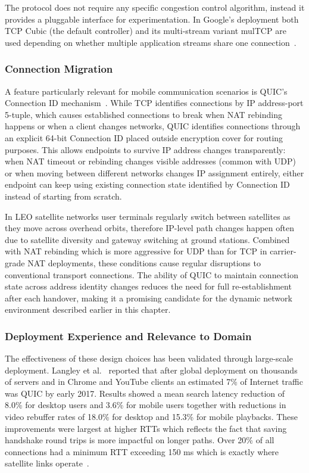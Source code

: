 The protocol does not require any specific congestion control algorithm, instead it provides a pluggable interface for experimentation. In Google's deployment both TCP Cubic (the default controller) and its multi-stream variant mulTCP are used depending on whether multiple application streams share one connection~\citep{LangleyAdam2017TQTP}.
\subsubsection{Connection Migration}

A feature particularly relevant for mobile communication scenarios is QUIC's Connection ID mechanism~\citep{LangleyAdam2017TQTP}. While TCP identifies connections by IP address-port 5-tuple, which causes established connections to break when NAT rebinding happens or when a client changes networks, QUIC identifies connections through an explicit 64-bit Connection ID placed outside encryption cover for routing purposes. This allows endpoints to survive IP address changes transparently: when NAT timeout or rebinding changes visible addresses (common with UDP) or when moving between different networks changes IP assignment entirely, either endpoint can keep using existing connection state identified by Connection ID instead of starting from scratch.

In LEO satellite networks user terminals regularly switch between satellites as they move across overhead orbits, therefore IP-level path changes happen often due to satellite diversity and gateway switching at ground stations. Combined with NAT rebinding which is more aggressive for UDP than for TCP in carrier-grade NAT deployments, these conditions cause regular disruptions to conventional transport connections. The ability of QUIC to maintain connection state across address identity changes reduces the need for full re-establishment after each handover, making it a promising candidate for the dynamic network environment described earlier in this chapter.
\subsubsection{Deployment Experience and Relevance to Domain}

The effectiveness of these design choices has been validated through large-scale deployment. Langley et al.~\citep{LangleyAdam2017TQTP} reported that after global deployment on thousands of servers and in Chrome and YouTube clients an estimated 7\% of Internet traffic was QUIC by early 2017. Results showed a mean search latency reduction of 8.0\% for desktop users and 3.6\% for mobile users together with reductions in video rebuffer rates of 18.0\% for desktop and 15.3\% for mobile playbacks. These improvements were largest at higher RTTs which reflects the fact that saving handshake round trips is more impactful on longer paths. Over 20\% of all connections had a minimum RTT exceeding 150 ms which is exactly where satellite links operate~\citep{LangleyAdam2017TQTP}.

